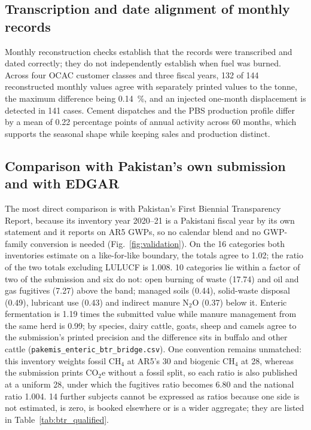 \documentclass[essd,manuscript]{copernicus}
\begin{document}
\subsection{Transcription and date alignment of monthly records}

Monthly reconstruction checks establish that the records were transcribed and dated correctly; they do not independently establish when fuel was burned. Across four OCAC customer classes and three fiscal years, \num{132} of \num{144} reconstructed monthly values agree with separately printed values to the tonne, the maximum difference being \SI{0.14}{\percent}, and an injected one-month displacement is detected in \num{141} cases. Cement dispatches and the PBS production profile differ by a mean of \num{0.22} percentage points of annual activity across \num{60} months, which supports the seasonal shape while keeping sales and production distinct.

\subsection{Comparison with Pakistan's own submission and with EDGAR}
\label{sec:btr}

The most direct comparison is with Pakistan's First Biennial Transparency Report, because its inventory year 2020--21 is a Pakistani fiscal year by its own statement and it reports on AR5 GWPs, so no calendar blend and no GWP-family conversion is needed (Fig.~\ref{fig:validation}). On the \num{16} categories both inventories estimate on a like-for-like boundary, the totals agree to \num{1.02}; the ratio of the two totals excluding LULUCF is \num{1.008}. \num{10} categories lie within a factor of two of the submission and six do not: open burning of waste (\num{17.74}) and oil and gas fugitives (\num{7.27}) above the band; managed soils (\num{0.44}), solid-waste disposal (\num{0.49}), lubricant use (\num{0.43}) and indirect manure N$_2$O (\num{0.37}) below it. Enteric fermentation is \num{1.19} times the submitted value while manure management from the same herd is \num{0.99}; by species, dairy cattle, goats, sheep and camels agree to the submission's printed precision and the difference sits in buffalo and other cattle (\texttt{pakemis\_enteric\_btr\_bridge.csv}). One convention remains unmatched: this inventory weights fossil CH$_4$ at AR5's \num{30} and biogenic CH$_4$ at \num{28}, whereas the submission prints CO$_2$e without a fossil split, so each ratio is also published at a uniform \num{28}, under which the fugitives ratio becomes \num{6.80} and the national ratio \num{1.004}. \num{14} further subjects cannot be expressed as ratios because one side is not estimated, is zero, is booked elsewhere or is a wider aggregate; they are listed in Table~\ref{tab:btr_qualified}.
\end{document}

